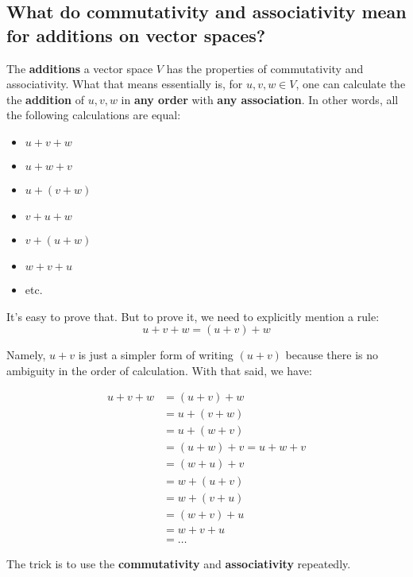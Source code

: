 \documentclass[12pt, letterpaper, oneside]{book}
\begin{document}
\subsection{
  What do commutativity and associativity mean for additions on vector spaces?
}

The \textbf{additions} a vector space $V$ has the properties of commutativity
and associativity. What that means essentially is, for $u, v, w \in V$, one can
calculate the the \textbf{addition} of $u, v, w$ in \textbf{any order} with
\textbf{any association}. In other words, all the following calculations are
equal:

\begin{itemize}
  \item $u + v + w$
  \item $u + w + v$
  \item $u + (v + w)$
  \item $v + u + w$
  \item $v + (u + w)$
  \item $w + v + u$
  \item etc.
\end{itemize}

It's easy to prove that. But to prove it, we need to explicitly mention a rule:
\[ u + v + w = (u + v) + w \]

Namely, $u + v$ is just a simpler form of writing $(u + v)$ because there is no
ambiguity in the order of calculation. With that said, we have:

\begin{equation*}
  \begin{split}
    u + v + w &= (u + v) + w \\
              &= u + (v + w) \\
              &= u + (w + v) \\
              &= (u + w) + v = u + w + v \\
              &= (w + u) + v \\
              &= w + (u + v) \\
              &= w + (v + u) \\
              &= (w + v) + u \\
              &= w + v + u \\
              &= \ldots 
  \end{split}
\end{equation*}

The trick is to use the \textbf{commutativity} and \textbf{associativity}
repeatedly.
\end{document}
